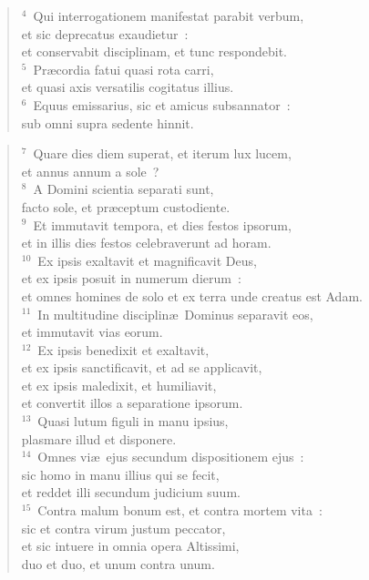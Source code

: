 \begin{flushleft}\begin{verse}${}^{4}$~Qui interrogationem manifestat parabit verbum,\\ et sic deprecatus exaudietur~:\\ et conservabit disciplinam, et tunc respondebit.\\
${}^{5}$~Pr\ae cordia fatui quasi rota carri,\\ et quasi axis versatilis cogitatus illius.\\
${}^{6}$~Equus emissarius, sic et amicus subsannator~:\\ sub omni supra sedente hinnit.\end{verse}\end{flushleft}


\begin{flushleft}\begin{verse}${}^{7}$~Quare dies diem superat, et iterum lux lucem,\\ et annus annum a sole~?\\
${}^{8}$~A Domini scientia separati sunt,\\ facto sole, et pr\ae ceptum custodiente.\\
${}^{9}$~Et immutavit tempora, et dies festos ipsorum,\\ et in illis dies festos celebraverunt ad horam.\\
${}^{10}$~Ex ipsis exaltavit et magnificavit Deus,\\ et ex ipsis posuit in numerum dierum~:\\ et omnes homines de solo et ex terra unde creatus est Adam.\\
${}^{11}$~In multitudine disciplin\ae\ Dominus separavit eos,\\ et immutavit vias eorum.\\
${}^{12}$~Ex ipsis benedixit et exaltavit,\\ et ex ipsis sanctificavit, et ad se applicavit,\\ et ex ipsis maledixit, et humiliavit,\\ et convertit illos a separatione ipsorum.\\
${}^{13}$~Quasi lutum figuli in manu ipsius,\\ plasmare illud et disponere.\\
${}^{14}$~Omnes vi\ae\ ejus secundum dispositionem ejus~:\\ sic homo in manu illius qui se fecit,\\ et reddet illi secundum judicium suum.\\
${}^{15}$~Contra malum bonum est, et contra mortem vita~:\\ sic et contra virum justum peccator,\\ et sic intuere in omnia opera Altissimi,\\ duo et duo, et unum contra unum.\end{verse}\end{flushleft}


